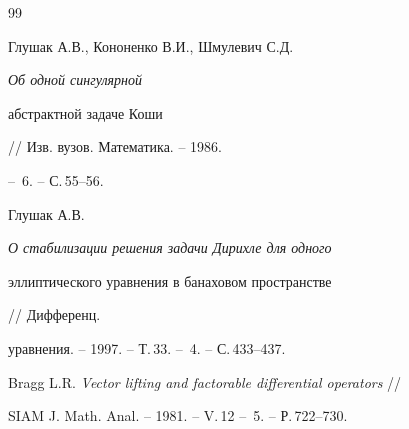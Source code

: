 \begin{thebibliography}{99}


Глушак А.В., Кононенко В.И., Шмулевич С.Д. {\em Об одной сингулярной  


абстрактной задаче Коши} // Изв. вузов. Математика. -- 1986. 


-- \No\,6. -- С.\,55--56. 




Глушак А.В. {\em О стабилизации решения задачи Дирихле для одного  


эллиптического уравнения в банаховом пространстве} // Дифференц.  


уравнения. -- 1997. -- Т.\,33. -- \No\,4. -- С.\,433--437. 




Bragg L.R. {\em Vector lifting and factorable differential operators} // 


SIAM J. Math. Anal. -- 1981. -- V.\,12 -- \No\,5. -- Р.\,722--730. 


 


\end{thebibliography} 


 


\vskip 2cm 


 






 


\label{end} 


 


